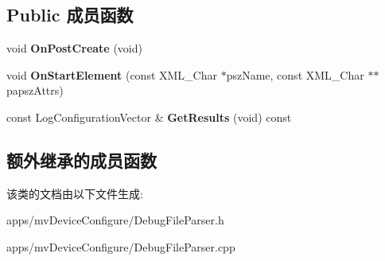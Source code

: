 \subsection*{Public 成员函数}
\begin{DoxyCompactItemize}
\item 
\hypertarget{class_log_configuration_file_parser_add2a165da6e031d9c20984f0d0aa6811}{void {\bfseries On\+Post\+Create} (void)}\label{class_log_configuration_file_parser_add2a165da6e031d9c20984f0d0aa6811}

\item 
\hypertarget{class_log_configuration_file_parser_a2ff94b07e99b835340f4c35f57d27bf5}{void {\bfseries On\+Start\+Element} (const X\+M\+L\+\_\+\+Char $\ast$psz\+Name, const X\+M\+L\+\_\+\+Char $\ast$$\ast$papsz\+Attrs)}\label{class_log_configuration_file_parser_a2ff94b07e99b835340f4c35f57d27bf5}

\item 
\hypertarget{class_log_configuration_file_parser_aafaee2ca9fb652b4e40cc7e51db758ab}{const Log\+Configuration\+Vector \& {\bfseries Get\+Results} (void) const }\label{class_log_configuration_file_parser_aafaee2ca9fb652b4e40cc7e51db758ab}

\end{DoxyCompactItemize}
\subsection*{额外继承的成员函数}


该类的文档由以下文件生成\+:\begin{DoxyCompactItemize}
\item 
apps/mv\+Device\+Configure/Debug\+File\+Parser.\+h\item 
apps/mv\+Device\+Configure/Debug\+File\+Parser.\+cpp\end{DoxyCompactItemize}
